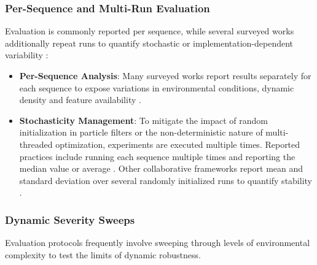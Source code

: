 \subsubsection{Per-Sequence and Multi-Run Evaluation}
Evaluation is commonly reported per sequence, while several surveyed works additionally repeat runs to quantify stochastic or implementation-dependent variability :

\begin{itemize}
    \item \textbf{Per-Sequence Analysis}:  Many surveyed works report results separately for each sequence to expose variations in environmental conditions, dynamic density and feature availability \cite{tian_dl-slot_2024} \cite{giberna_dynemo-slam_2025} \cite{zhang_semantic-integrated_2026}.
    \item \textbf{Stochasticity Management}: To mitigate the impact of random initialization in particle filters or the non-deterministic nature of multi-threaded optimization, experiments are executed multiple times.
     Reported practices include running each sequence multiple times and reporting the median value \cite{zhang_semantic-integrated_2026} or average \cite{scherer_ogm2pgbm_2023}.
    Other collaborative frameworks report mean and standard deviation over several randomly initialized runs to quantify stability \cite{greve_collaborative_2024}.
\end{itemize}

\subsubsection{Dynamic Severity Sweeps}
Evaluation protocols frequently involve sweeping through levels of environmental complexity to test the limits of dynamic robustness.

